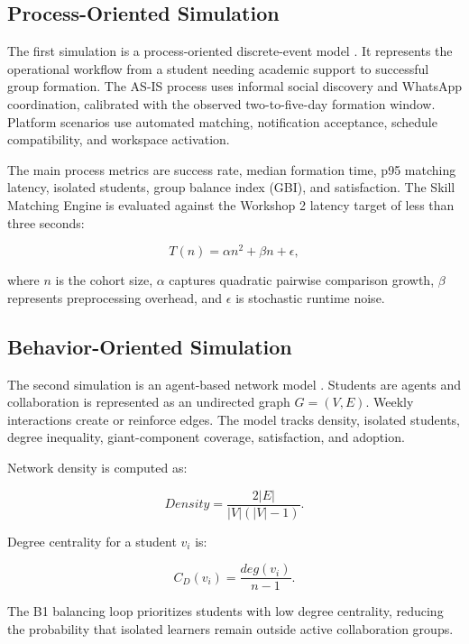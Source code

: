 \documentclass[conference]{IEEEtran}
\begin{document}
\subsection{Process-Oriented Simulation}

The first simulation is a process-oriented discrete-event model \cite{banks2010,law2015}. It represents the operational workflow from a student needing academic support to successful group formation. The AS-IS process uses informal social discovery and WhatsApp coordination, calibrated with the observed two-to-five-day formation window. Platform scenarios use automated matching, notification acceptance, schedule compatibility, and workspace activation.

The main process metrics are success rate, median formation time, p95 matching latency, isolated students, group balance index (GBI), and satisfaction. The Skill Matching Engine is evaluated against the Workshop 2 latency target of less than three seconds:

\begin{equation}
T(n)=\alpha n^2 + \beta n + \epsilon,
\end{equation}

where $n$ is the cohort size, $\alpha$ captures quadratic pairwise comparison growth, $\beta$ represents preprocessing overhead, and $\epsilon$ is stochastic runtime noise.

\subsection{Behavior-Oriented Simulation}

The second simulation is an agent-based network model \cite{railsback2019}. Students are agents and collaboration is represented as an undirected graph $G=(V,E)$. Weekly interactions create or reinforce edges. The model tracks density, isolated students, degree inequality, giant-component coverage, satisfaction, and adoption.

Network density is computed as:

\begin{equation}
Density=\frac{2|E|}{|V|(|V|-1)}.
\end{equation}

Degree centrality for a student $v_i$ is:

\begin{equation}
C_D(v_i)=\frac{deg(v_i)}{n-1}.
\end{equation}

The B1 balancing loop prioritizes students with low degree centrality, reducing the probability that isolated learners remain outside active collaboration groups.
\end{document}
